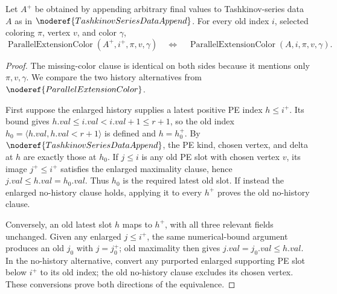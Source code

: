 \begin{lemma}
Let \(A^+\) be obtained by appending arbitrary final values to Tashkinov-series
data \(A\) as in \(\noderef{TashkinovSeriesDataAppend}\).  For every old
index \(i\), selected coloring \(\pi\), vertex \(v\), and color \(\gamma\),
\[
 \operatorname{ParallelExtensionColor}(A^+,i^+,\pi,v,\gamma)
 \quad\Longleftrightarrow\quad
 \operatorname{ParallelExtensionColor}(A,i,\pi,v,\gamma).
\]
\end{lemma}
\begin{proof}
The missing-color clause is identical on both sides because it mentions only
\(\pi,v,\gamma\).  We compare the two history alternatives from
\(\noderef{ParallelExtensionColor}\).

First suppose the enlarged history supplies a latest positive PE index
\(h\leq i^+\).  Its bound gives
\(h.val\leq i.val<i.val+1\leq r+1\), so the old index
\(h_0=\langle h.val,h.val<r+1\rangle\) is defined and \(h=h_0^+\).
By \(\noderef{TashkinovSeriesDataAppend}\), the PE kind, chosen vertex, and
delta at \(h\) are exactly those at \(h_0\).  If \(j\leq i\) is any old PE
slot with chosen vertex \(v\), its image \(j^+\leq i^+\) satisfies the
enlarged maximality clause, hence \(j.val\leq h.val=h_0.val\).  Thus \(h_0\)
is the required latest old slot.  If instead the enlarged no-history clause
holds, applying it to every \(h^+\) proves the old no-history clause.

Conversely, an old latest slot \(h\) maps to \(h^+\), with all three relevant
fields unchanged.  Given any enlarged \(j\leq i^+\), the same numerical-bound
argument produces an old \(j_0\) with \(j=j_0^+\); old maximality then gives
\(j.val=j_0.val\leq h.val\).  In the no-history alternative, convert any
purported enlarged supporting PE slot below \(i^+\) to its old index; the old
no-history clause excludes its chosen vertex.  These conversions prove both
directions of the equivalence.
\end{proof}
